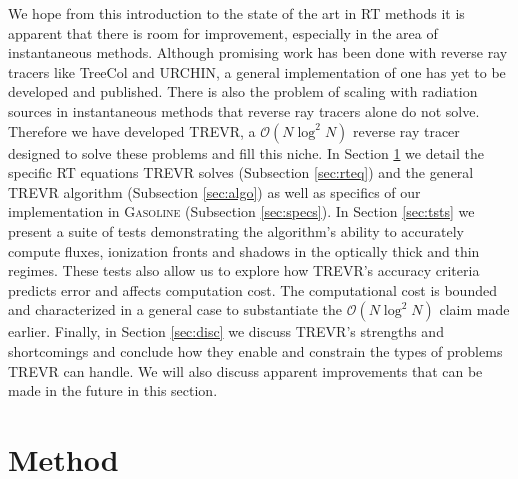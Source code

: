 \documentclass[fleq,usenatbib]{mnras}
\newcommand{\acro}{TREVR}
\newcommand{\bigO}[1]{\mathcal{O}\left(#1\right)}
\begin{document}
We hope from this introduction to the state of the art in RT methods it is 
apparent that there is room for improvement, especially in the area of 
instantaneous methods. Although promising work has been done with reverse ray 
tracers like TreeCol and URCHIN, a general implementation of one has yet to be 
developed and published. There is also the problem of scaling with radiation 
sources in instantaneous methods that reverse ray tracers alone do not solve. 
Therefore we have developed \acro{}, a $\bigO{N \log^2 N}$ reverse ray tracer 
designed to solve these problems and fill this niche. In Section 
\ref{sec:mthd} we detail the specific RT equations \acro{} solves 
(Subsection \ref{sec:rteq}) and the general \acro{} algorithm (Subsection 
\ref{sec:algo}) as well as specifics of our implementation in 
\textsc{Gasoline} (Subsection \ref{sec:specs}). In Section \ref{sec:tsts} we 
present a suite of tests demonstrating the algorithm's ability to accurately 
compute fluxes, ionization fronts and shadows in the optically thick and thin 
regimes. These tests also allow us to explore how \acro{}'s accuracy criteria 
predicts error and affects computation cost. The computational cost is bounded 
and characterized in a general case to substantiate the $\bigO{N \log^2 N}$ 
claim made earlier. Finally, in Section \ref{sec:disc} we discuss \acro{}'s 
strengths and shortcomings and conclude how they enable and constrain the 
types of problems \acro{} can handle. We will also discuss apparent 
improvements that can be made in the future in this section.

\section{Method}\label{sec:mthd}
\end{document}
